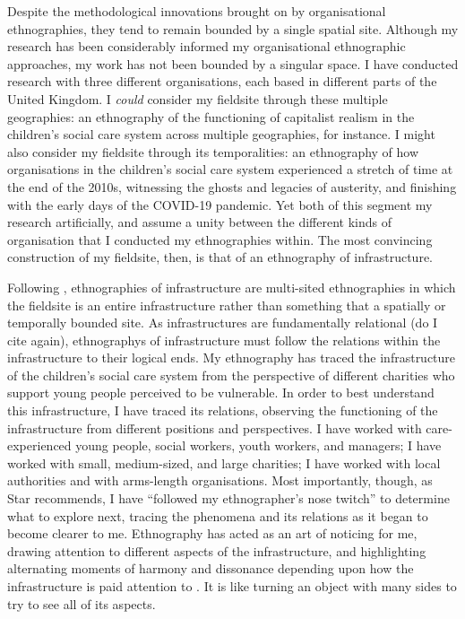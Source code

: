 Despite the methodological innovations brought on by organisational ethnographies, they tend to remain bounded by a single spatial site. Although my research has been considerably informed my organisational ethnographic approaches, my work has not been bounded by a singular space. I have conducted research with three different organisations, each based in different parts of the United Kingdom. I \textit{could} consider my fieldsite through these multiple geographies: an ethnography of the functioning of capitalist realism in the children's social care system across multiple geographies, for instance. I might also consider my fieldsite through its temporalities: an ethnography of how organisations in the children's social care system experienced a stretch of time at the end of the 2010s, witnessing the ghosts and legacies of austerity, and finishing with the early days of the COVID-19 pandemic. Yet both of this segment my research artificially, and assume a unity between the different kinds of organisation that I conducted my ethnographies within. The most convincing construction of my fieldsite, then, is that of an ethnography of infrastructure. 

Following \citep{star_ethnography_1999}, ethnographies of infrastructure are multi-sited ethnographies in which the fieldsite is an entire infrastructure rather than something that a spatially or temporally bounded site. As infrastructures are fundamentally relational (do I cite again), ethnographys of infrastructure must follow the relations within the infrastructure to their logical ends. My ethnography has traced the infrastructure of the children’s social care system from the perspective of different charities who support young people perceived to be vulnerable. In order to best understand this infrastructure, I have traced its relations, observing the functioning of the infrastructure from different positions and perspectives. I have worked with care-experienced young people, social workers, youth workers, and managers; I have worked with small, medium-sized, and large charities; I have worked with local authorities and with arms-length organisations. Most importantly, though, as Star recommends, I have “followed my ethnographer’s nose twitch” to determine what to explore next, tracing the phenomena and its relations as it began to become clearer to me. Ethnography has acted as an art of noticing for me, drawing attention to different aspects of the infrastructure, and highlighting alternating moments of harmony and dissonance depending upon how the infrastructure is paid attention to \cite{tsing_mushroom_2017, 24}. It is like turning an object with many sides to try to see all of its aspects.  

